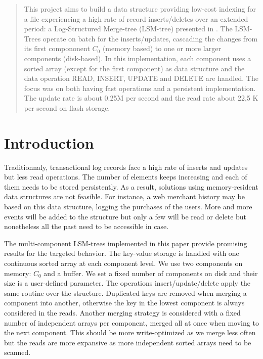 \documentclass{sig-alternate-05-2015}
\begin{document}

\maketitle
\begin{abstract}
This project aims to build a data structure providing low-cost indexing for a file experiencing a high rate of record inserts/deletes over an extended period: a Log-Structured Merge-tree (LSM-tree) presented in \cite{lsm}. The LSM-Trees operate on batch for the inserts/updates, cascading the changes from its first compononent $C_0$ (memory based) to one or more larger components (disk-based). In this implementation, each component uses a sorted array (except for the first component) as data structure and the data operation READ, INSERT, UPDATE and DELETE are handled. The focus was on both having fast operations and a persistent implementation. The update rate is about 0.25M per second and the read rate about 22,5 K per second on flash storage.

\end{abstract}


%
%



\section{Introduction}

Traditionnaly, transactional log records face a high rate of inserts and updates but less read operations. The number of elements keeps increasing and each of them needs to be stored persistently. As a result, solutions using memory-resident data structures are not feasible. For instance, a web merchant history may be based on this data structure, logging the purchases of the users. More and more events will be added to the structure but only a few will be read or delete but nonetheless all the past need to be accessible in case.

The multi-component LSM-trees implemented in this paper provide promising results for the targeted behavior. The key-value storage is handled with one continuous sorted array at each component level. We use two components on memory: $C_0$ and a buffer. We set a fixed number of components on disk and their size is a user-defined parameter. The operations insert/update/delete apply the same routine over the structure. Duplicated keys are removed when merging a component into another, otherwise the key in the lowest component is always considered in the reads. Another merging strategy is considered with a fixed number of independent arrays per component, merged all at once when moving to the next component. This should be more write-optimized as we merge less often but the reads are more expansive as more independent sorted arrays need to be scanned.
\end{document}
